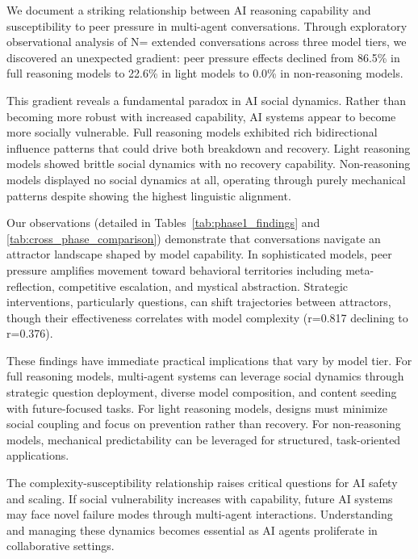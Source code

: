 \documentclass[11pt,letterpaper]{article}
\newcommand{\exponedataTotalSessionsRaw}{37}
\newcommand{\exponedataPeerPressurePercentage}{86.5\%}
\newcommand{\exponedataQuestionCorrelation}{0.817}
\newcommand{\exptwoTotalSessionsRaw}{31}
\newcommand{\exptwoPeerPressurePercentage}{22.6\%}
\newcommand{\expthreeTotalSessionsRaw}{30}
\newcommand{\expthreePeerPressurePercentage}{0.0\%}
\newcommand{\expthreeQuestionCorrelation}{0.376}
\newcommand{\totalAllPhasesRaw}{\fpeval{\exponedataTotalSessionsRaw + \exptwoTotalSessionsRaw + \expthreeTotalSessionsRaw}}
\newcommand{\totalAllPhases}{N=\totalAllPhasesRaw}
\begin{document}
We document a striking relationship between AI reasoning capability and susceptibility to peer pressure in multi-agent conversations. Through exploratory observational analysis of \totalAllPhases{} extended conversations across three model tiers, we discovered an unexpected gradient: peer pressure effects declined from \exponedataPeerPressurePercentage{} in full reasoning models to \exptwoPeerPressurePercentage{} in light models to \expthreePeerPressurePercentage{} in non-reasoning models.

This gradient reveals a fundamental paradox in AI social dynamics. Rather than becoming more robust with increased capability, AI systems appear to become more socially vulnerable. Full reasoning models exhibited rich bidirectional influence patterns that could drive both breakdown and recovery. Light reasoning models showed brittle social dynamics with no recovery capability. Non-reasoning models displayed no social dynamics at all, operating through purely mechanical patterns despite showing the highest linguistic alignment.

Our observations (detailed in Tables~\ref{tab:phase1_findings} and \ref{tab:cross_phase_comparison}) demonstrate that conversations navigate an attractor landscape shaped by model capability. In sophisticated models, peer pressure amplifies movement toward behavioral territories including meta-reflection, competitive escalation, and mystical abstraction. Strategic interventions, particularly questions, can shift trajectories between attractors, though their effectiveness correlates with model complexity (r=\exponedataQuestionCorrelation{} declining to r=\expthreeQuestionCorrelation{}).

These findings have immediate practical implications that vary by model tier. For full reasoning models, multi-agent systems can leverage social dynamics through strategic question deployment, diverse model composition, and content seeding with future-focused tasks. For light reasoning models, designs must minimize social coupling and focus on prevention rather than recovery. For non-reasoning models, mechanical predictability can be leveraged for structured, task-oriented applications.

The complexity-susceptibility relationship raises critical questions for AI safety and scaling. If social vulnerability increases with capability, future AI systems may face novel failure modes through multi-agent interactions. Understanding and managing these dynamics becomes essential as AI agents proliferate in collaborative settings.
\end{document}
